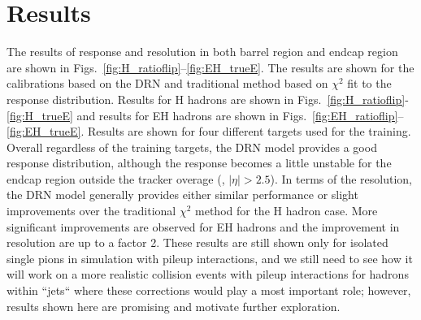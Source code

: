 \section{Results}
The results of response and resolution in both barrel region and endcap region are shown in Figs.~\ref{fig:H_ratioflip}--\ref{fig:EH_trueE}.
The results are shown for the calibrations based on the DRN and traditional method based on $\chi^2$ fit to the response distribution.
Results for H hadrons are shown in Figs.~\ref{fig:H_ratioflip}-\ref{fig:H_trueE} and results for EH hadrons are shown in Figs.~\ref{fig:EH_ratioflip}--\ref{fig:EH_trueE}.
Results are shown for four different targets used for the training.
Overall regardless of the training targets, the DRN model provides a good response distribution, although the response becomes a little unstable for the endcap region outside the tracker overage (\ie, $|\eta|>2.5$).
In terms of the resolution, the DRN model generally provides either similar performance or slight improvements over the traditional $\chi^2$ method for the H hadron case.
More significant improvements are observed for EH hadrons and the improvement in resolution are up to a factor 2.
These results are still shown only for isolated single pions in simulation with pileup interactions, and we still need to see how it will work on a more realistic collision events with pileup interactions for hadrons within ``jets`` where these corrections would play a most important role; however, results shown here are promising and motivate further exploration.












